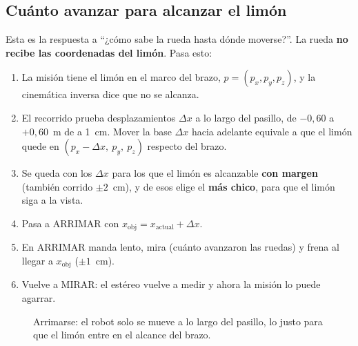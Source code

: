 \subsection{Cuánto avanzar para alcanzar el limón}\label{sec:arrimar}
Esta es la respuesta a ``¿cómo sabe la rueda hasta dónde moverse?''. La rueda \textbf{no recibe las coordenadas del
limón}. Pasa esto:

\begin{enumerate}
  \item La misión tiene el limón en el marco del brazo, $p = (p_x, p_y, p_z)$, y la cinemática inversa dice que no
        se alcanza.
  \item El recorrido prueba desplazamientos $\Delta x$ a lo largo del pasillo, de $-0{,}60$ a $+0{,}60$~m de a
        1~cm. Mover la base $\Delta x$ hacia adelante equivale a que el limón quede en
        $(p_x - \Delta x,\ p_y,\ p_z)$ respecto del brazo.
  \item Se queda con los $\Delta x$ para los que el limón es alcanzable \textbf{con margen} (también corrido
        $\pm 2$~cm), y de esos elige el \textbf{más chico}, para que el limón siga a la vista.
  \item Pasa a ARRIMAR con $x_\text{obj} = x_\text{actual} + \Delta x$.
  \item En ARRIMAR manda  lento, mira  (cuánto avanzaron las ruedas) y frena al llegar a
        $x_\text{obj}$ ($\pm 1$~cm).
  \item Vuelve a MIRAR: el estéreo vuelve a medir y ahora la misión lo puede agarrar.
\end{enumerate}

\begin{figure}[H]
\centering
{}
\caption{Arrimarse: el robot solo se mueve a lo largo del pasillo, lo justo para que el limón entre en el alcance
del brazo.}
\end{figure}

